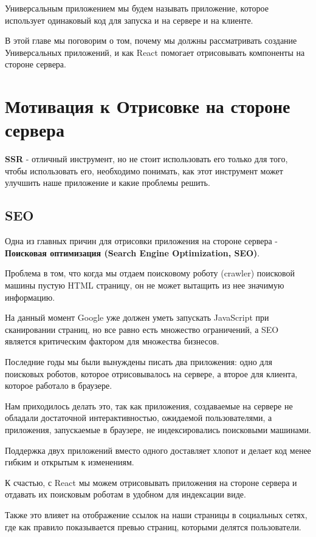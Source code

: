 Универсальным приложением мы будем называть приложение, которое использует одинаковый код для запуска и на сервере и на клиенте.

В этой главе мы поговорим о том, почему мы должны рассматривать создание Универсальных приложений, и как React помогает отрисовывать компоненты на стороне сервера.


\section{Мотивация к Отрисовке на стороне сервера}

\textbf{SSR} - отличный инструмент, но не стоит использовать его только для того, чтобы использовать его, необходимо понимать, как этот инструмент может улучшить наше приложение и какие проблемы решить.

\subsection{SEO}

Одна из главных причин для отрисовки приложения на стороне сервера - \textbf{Поисковая оптимизация (Search Engine Optimization, SEO)}.

Проблема в том, что когда мы отдаем поисковому роботу (crawler) поисковой машины пустую HTML страницу, он не может вытащить из нее значимую информацию. 

На данный момент Google уже должен уметь запускать JavaScript при сканировании страниц, но все равно есть множество ограничений, а SEO является критическим фактором для множества бизнесов.

Последние годы мы были вынуждены писать два приложения: одно для поисковых роботов, которое отрисовывалось на сервере, а второе для клиента, которое работало в браузере.

Нам приходилось делать это, так как приложения, создаваемые на сервере не обладали достаточной интерактивностью, ожидаемой пользователями, а приложения, запускаемые в браузере, не индексировались поисковыми машинами.

Поддержка двух приложений вместо одного доставляет хлопот и делает код менее гибким и открытым к изменениям.

К счастью, с React мы можем отрисовывать приложения на стороне сервера и отдавать их поисковым роботам в удобном для индексации виде.

Также это влияет на отображение ссылок на наши страницы в социальных сетях, где как правило показывается превью страниц, которыми делятся пользователи.

